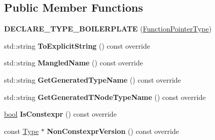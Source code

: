 \subsection*{Public Member Functions}
\begin{DoxyCompactItemize}
\item 
\mbox{\label{classv8_1_1internal_1_1torque_1_1FunctionPointerType_a625f5936b2559439e36150db56679cb9}} 
{\bfseries D\+E\+C\+L\+A\+R\+E\+\_\+\+T\+Y\+P\+E\+\_\+\+B\+O\+I\+L\+E\+R\+P\+L\+A\+TE} (\mbox{\hyperlink{classv8_1_1internal_1_1torque_1_1FunctionPointerType}{Function\+Pointer\+Type}})
\item 
\mbox{\label{classv8_1_1internal_1_1torque_1_1FunctionPointerType_ac20cb8062b5f83d1414976edc09a80b8}} 
std\+::string {\bfseries To\+Explicit\+String} () const override
\item 
\mbox{\label{classv8_1_1internal_1_1torque_1_1FunctionPointerType_abc259e770f4398e69783492b0b5f809f}} 
std\+::string {\bfseries Mangled\+Name} () const override
\item 
\mbox{\label{classv8_1_1internal_1_1torque_1_1FunctionPointerType_a5a6724914dbe86efa9f475ad45166332}} 
std\+::string {\bfseries Get\+Generated\+Type\+Name} () const override
\item 
\mbox{\label{classv8_1_1internal_1_1torque_1_1FunctionPointerType_a0130cbcdf8965654f29c2bcc7f8cc35d}} 
std\+::string {\bfseries Get\+Generated\+T\+Node\+Type\+Name} () const override
\item 
\mbox{\label{classv8_1_1internal_1_1torque_1_1FunctionPointerType_a25a2355dd411a875e0cf53a8d385cb18}} 
\mbox{\hyperlink{classbool}{bool}} {\bfseries Is\+Constexpr} () const override
\item 
\mbox{\label{classv8_1_1internal_1_1torque_1_1FunctionPointerType_a51fbfd1f59490edb560ce00b6d35c7d0}} 
const \mbox{\hyperlink{classv8_1_1internal_1_1torque_1_1Type}{Type}} $\ast$ {\bfseries Non\+Constexpr\+Version} () const override

\end{DoxyCompactItemize}
